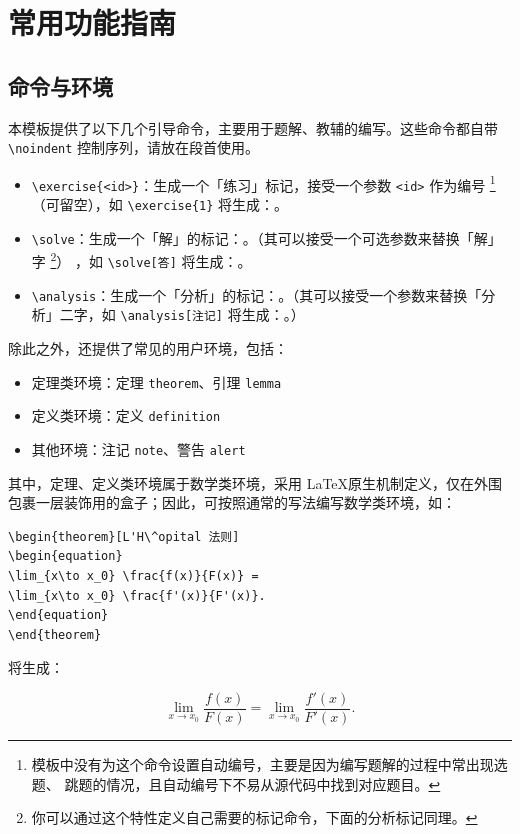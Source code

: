 \documentclass[
  10pt,
  twoside,
  openany,
  b5paper, %
  colorscheme = rbb, %
  xits = false,
]{qyxf-book}
\begin{document}
\section{常用功能指南}

\subsection{命令与环境}

本模板提供了以下几个引导命令，主要用于题解、教辅的编写。这些命令都自带 \verb|\noindent| 控制序列，请放在段首使用。

\begin{itemize}
  \item \verb|\exercise{<id>}|：生成一个「练习」标记，接受一个参数 \verb|<id>| 作为编号
        \footnote{模板中没有为这个命令设置自动编号，主要是因为编写题解的过程中常出现选题、
        跳题的情况，且自动编号下不易从源代码中找到对应题目。}
        （可留空），如 \verb|\exercise{1}| 将生成：。
  \item \verb|\solve|：生成一个「解」的标记：\solve。（其可以接受一个可选参数来替换「解」字
  \footnote{你可以通过这个特性定义自己需要的标记命令，下面的分析标记同理。}）
  ，如 \verb|\solve[答]| 将生成：\solve[答]。
  \item \verb|\analysis|：生成一个「分析」的标记：\analysis。（其可以接受一个参数来替换「分析」二字，如 \verb|\analysis[注记]| 将生成：\analysis[注记]。）
\end{itemize}

除此之外，还提供了常见的用户环境，包括：
\begin{itemize}
  \item 定理类环境：定理 \verb|theorem|、引理 \verb|lemma|
  \item 定义类环境：定义 \verb|definition|
  \item 其他环境：注记 \verb|note|、警告 \verb|alert|
\end{itemize}
其中，定理、定义类环境属于数学类环境，采用 \LaTeX 原生机制定义，仅在外围包裹一层装饰用的盒子；因此，可按照通常的写法编写数学类环境，如：
\begin{tcolorbox}
  \begin{verbatim}
\begin{theorem}[L'H\^opital 法则]
\begin{equation}
\lim_{x\to x_0} \frac{f(x)}{F(x)} =
\lim_{x\to x_0} \frac{f'(x)}{F'(x)}.
\end{equation}
\end{theorem}
\end{verbatim}
\end{tcolorbox}
将生成：
\begin{theorem}[L'H\^opital 法则]
\begin{equation}
\lim_{x\to x_0} \frac{f(x)}{F(x)} =
\lim_{x\to x_0} \frac{f'(x)}{F'(x)}.
\end{equation}
\end{theorem}
\end{document}
